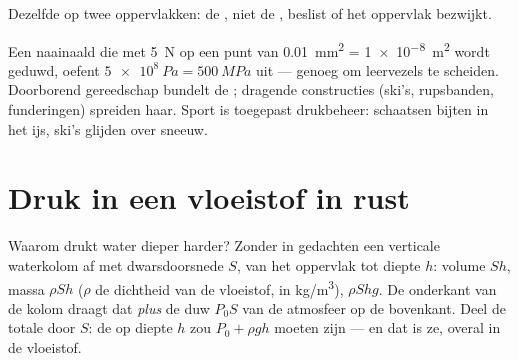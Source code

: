 \begin{omfigure}
\qquad
{}

{\small Dezelfde  op twee oppervlakken: de , niet de ,
beslist of het oppervlak bezwijkt.}
\end{omfigure}

\begin{remark}\label{rem:g10:pressure:tools}
Een naainaald die met \qty{5}{N} op een punt van \qty{0.01}{mm^2} =
\qty{1e-8}{m^2} wordt geduwd, oefent $\qty{5e8}{Pa} = \qty{500}{MPa}$
uit --- genoeg om leervezels te scheiden. Doorborend gereedschap bundelt
de ; dragende constructies (ski's, rupsbanden, funderingen)
spreiden haar. Sport is toegepast drukbeheer: schaatsen bijten in het
ijs, ski's glijden over sneeuw.
\end{remark}

\section{Druk in een vloeistof in rust}

Waarom drukt water dieper harder? Zonder in gedachten een verticale
waterkolom af met dwarsdoorsnede $S$, van het oppervlak tot diepte $h$:
volume $Sh$, massa $\rho S h$ ($\rho$ de dichtheid van de vloeistof, in
\unit{kg/m^3}),  $\rho S h g$. De onderkant van de kolom draagt
dat  \emph{plus} de duw $P_0 S$ van de atmosfeer op de bovenkant.
Deel de totale  door $S$: de  op diepte $h$ zou
$P_0 + \rho g h$ moeten zijn --- en dat is ze, overal in de vloeistof.

